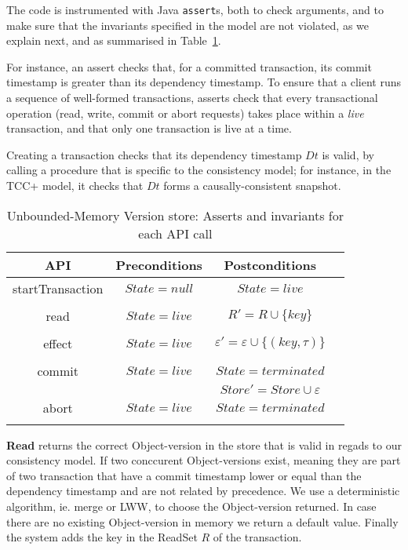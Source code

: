 \documentclass[systeme,french,english]{compas2022}
\begin{document}
The code is instrumented with Java \texttt{assert}s, both to check
arguments, and to make sure that the invariants specified in the model
are not violated, as we explain next, and as summarised in
Table~\ref{tab:AssertInvariantsUnbounded}.

For instance, an assert checks that, for a committed transaction, its
commit timestamp is greater than its dependency timestamp.
To ensure that a client runs a sequence of well-formed transactions,
asserts check that every transactional operation (read, write, commit or
abort requests) takes place within a \emph{live} transaction, and that
only one transaction is live at a time.

Creating a transaction checks that its dependency timestamp $Dt$ is
valid, by calling a procedure that is specific to the consistency model;
for instance, in the TCC+ model, it checks that $Dt$ forms a
causally-consistent snapshot.

\begin{table}
  \centering
  \begin{tabular}{|c|c|c|c|}
    \hline

    API & Preconditions & Postconditions\\
    \hline
    startTransaction & $\mathit{State = null}$ & $\mathit{State = live}$\\
    & &  \\
    \hline
    read & $\mathit{State = live}$ & $\mathit{R' = R \cup \{key\}}$\\
    &  & \\
    \hline
    effect & $\mathit{State = live}$ & $\mathit{\varepsilon' = \varepsilon \cup \{(key, \tau)\}}$ \\
    &  & \\
    \hline
    commit & $\mathit{State = live}$ & $\mathit{State = terminated}$\\
    &  & $\mathit{Store' = Store \cup \varepsilon}$ \\
    \hline
    abort & $\mathit{State = live}$ & $\mathit{State = terminated}$ \\
    &  &   \\
    \hline

  \end{tabular}
  \caption{Unbounded-Memory Version store: Asserts and invariants for each API call}
  \label{tab:AssertInvariantsUnbounded}
\end{table}

\textbf{Read} returns the correct Object-version in the store that is valid in regads to our consistency model.
If two conccurent Object-versions exist, meaning they are part of two transaction that have a commit timestamp lower or equal than the dependency timestamp and are not related by precedence.
We use a deterministic algorithm, ie. merge or LWW, to choose the Object-version returned.
In case there are no existing Object-version in memory we return a default value.
Finally the system adds the key in the ReadSet $R$ of the transaction. 
\end{document}
